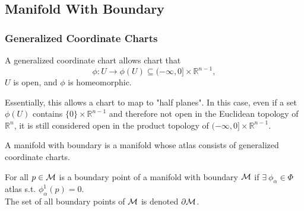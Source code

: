 \documentclass[../main.tex]{subfiles}
\begin{document}
    \subsection{Manifold With Boundary}
    \subsubsection{Generalized Coordinate Charts}
    \begin{definition}\label{def:half-plane-chart}
        A generalized coordinate chart allows chart that 
        \[
        \phi : U \to \phi(U) \subseteq (-\infty, 0] \times \mathbb{R}^{n-1},
        \]
        \(U\) is open, and \(\phi\) is homeomorphic. \par
    \end{definition}
    \begin{remark}
        Essentially, this allows a chart to map to "half planes". In this case, 
        even if a set \(\phi(U)\) contains \(\{0\} \times \mathbb{R}^{n-1}\) and 
        therefore not open in the Euclidean topology of \(\mathbb{R}^n\), it 
        is still considered open in the product topology of 
        \((-\infty, 0] \times \mathbb{R}^{n-1}\).
    \end{remark}
    \begin{definition}\label{def:bounded-manifold}
        A manifold with boundary is a manifold whose atlas consists of generalized 
        coordinate charts.
    \end{definition}
    \begin{definition}\label{def:manifold-boundary}
        For all \(p \in \manifold[M]\) is a boundary point of a manifold with 
        boundary \(\manifold[M]\) if \(\exists~\phi_\alpha \in \Phi\) atlas 
        s.t. \(\phi_\alpha^1(p)=0\). \\
        The set of all boundary points of \(\manifold[M]\) is denoted \(\bnd{M}\).
    \end{definition}
\end{document}
